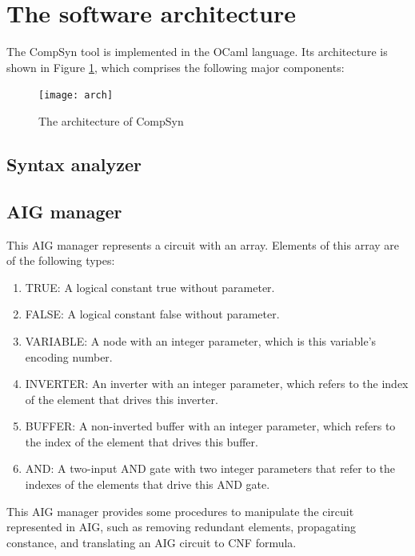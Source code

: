 \documentclass[runningheads,a4paper]{llncs}
\begin{document}
\section{The software architecture}\label{sec_arch}
The CompSyn tool is implemented in the OCaml language.
Its architecture is shown in Figure \ref{fig_arch},
which comprises the following major components:

\begin{figure}[b]
\centering
\texttt{[image: arch]}
\caption{The architecture of CompSyn}
\label{fig_arch}
\end{figure}

\subsection{Syntax analyzer}



\subsection{AIG manager}

This AIG manager represents a circuit with an array.
Elements of this array are of the following types:

\begin{enumerate}
\item TRUE: A logical constant true without parameter.
\item FALSE: A logical constant false without parameter.
\item VARIABLE: A node with an integer parameter,
which is this variable's encoding number.
\item INVERTER: An inverter with an integer parameter,
which refers to the index of the element that drives this inverter.
\item BUFFER:   A non-inverted buffer with an integer parameter,
which refers to the index of the element that drives this buffer.
\item AND: A two-input AND gate with two integer parameters that refer to the indexes of the elements that drive this AND gate.
\end{enumerate}

This AIG manager provides some procedures to manipulate the circuit represented in AIG,
such as removing redundant elements,
propagating constance,
and translating an AIG circuit to CNF formula.
\end{document}
